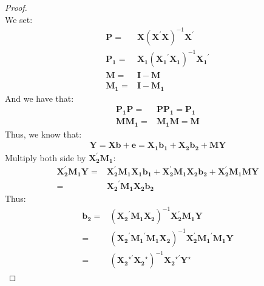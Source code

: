 \documentclass{article}
\begin{document}
	\begin{proof}
		\mbox{}\\
		We set:
			\begin{align*}
				\boldsymbol{P} = &\boldsymbol{X}(\boldsymbol{X}^\prime \boldsymbol{X})^{-1} \boldsymbol{X}^\prime\\
				\boldsymbol{P_1} = &\boldsymbol{X_1}(\boldsymbol{X_1}^\prime \boldsymbol{X_1})^{-1} \boldsymbol{X_1}^\prime\\
				\boldsymbol{M} = &\boldsymbol{I} - \boldsymbol{M}\\
				\boldsymbol{M_1} = &\boldsymbol{I} - \boldsymbol{M_1}
			\end{align*}
		And we have that:
			\begin{align*}
				\boldsymbol{P_1}\boldsymbol{P} = &\boldsymbol{P}\boldsymbol{P_1} = \boldsymbol{P_1}\\
				\boldsymbol{M}\boldsymbol{M_1} = &\boldsymbol{M_1}\boldsymbol{M} = \boldsymbol{M} 
			\end{align*}	
		Thus, we know that:
			\begin{align*}
				\boldsymbol{Y} = \boldsymbol{X}\boldsymbol{b} + \boldsymbol{e} = \boldsymbol{X_1}\boldsymbol{b_1} + \boldsymbol{X_2}\boldsymbol{b_2} + \boldsymbol{M}\boldsymbol{Y}
			\end{align*}
		Multiply both side by $\boldsymbol{X^\prime_2}\boldsymbol{M_1}$:
			\begin{align*}
				\boldsymbol{X^\prime_2}\boldsymbol{M_1}\boldsymbol{Y} = &\boldsymbol{X^\prime_2}\boldsymbol{M_1}\boldsymbol{X_1}\boldsymbol{b_1} + \boldsymbol{X^\prime_2}\boldsymbol{M_1}\boldsymbol{X_2}\boldsymbol{b_2} + \boldsymbol{X^\prime_2}\boldsymbol{M_1}\boldsymbol{M}\boldsymbol{Y}\\
				= &\boldsymbol{X_2}^\prime\boldsymbol{M_1}\boldsymbol{X_2}\boldsymbol{b_2}
			\end{align*}
		Thus:
			\begin{align*}
				\boldsymbol{b_2} = &(\boldsymbol{X_2}^\prime\boldsymbol{M_1}\boldsymbol{X_2})^{-1} \boldsymbol{X^\prime_2}\boldsymbol{M_1}\boldsymbol{Y}\\
				= &(\boldsymbol{X_2}^\prime\boldsymbol{M_1}^\prime\boldsymbol{M_1}\boldsymbol{X_2})^{-1} \boldsymbol{X^\prime_2}\boldsymbol{M_1}^\prime\boldsymbol{M_1}\boldsymbol{Y}\\
				= &(\boldsymbol{X_2}^{\star\prime}\boldsymbol{X_2}^\star)^{-1} \boldsymbol{X_2}^{\star\prime}\boldsymbol{Y}^\star 
			\end{align*}
	\end{proof}
\end{document}
